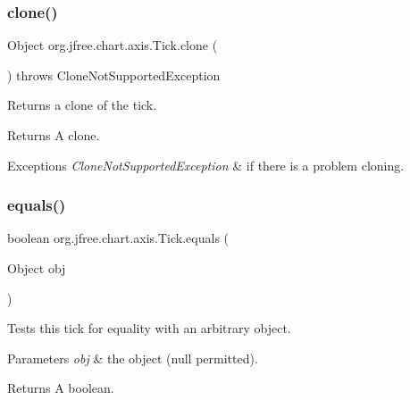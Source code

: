 \subsubsection{\texorpdfstring{clone()}{clone()}}
{\footnotesize\ttfamily Object org.\+jfree.\+chart.\+axis.\+Tick.\+clone (\begin{DoxyParamCaption}{ }\end{DoxyParamCaption}) throws Clone\+Not\+Supported\+Exception}

Returns a clone of the tick.

\begin{DoxyReturn}{Returns}
A clone.
\end{DoxyReturn}

\begin{DoxyExceptions}{Exceptions}
{\em Clone\+Not\+Supported\+Exception} & if there is a problem cloning. \\
\hline
\end{DoxyExceptions}
\mbox{\label{classorg_1_1jfree_1_1chart_1_1axis_1_1_tick_a9cac78e6fd43f85c0ce9f012579ed8b3}} 
\subsubsection{\texorpdfstring{equals()}{equals()}}
{\footnotesize\ttfamily boolean org.\+jfree.\+chart.\+axis.\+Tick.\+equals (\begin{DoxyParamCaption}\item[{Object}]{obj }\end{DoxyParamCaption})}

Tests this tick for equality with an arbitrary object.


\begin{DoxyParams}{Parameters}
{\em obj} & the object ({\ttfamily null} permitted).\\
\hline
\end{DoxyParams}
\begin{DoxyReturn}{Returns}
A boolean. 
\end{DoxyReturn}
\mbox{\label{classorg_1_1jfree_1_1chart_1_1axis_1_1_tick_aeae836adb630dc541a073be7ca934eec}} 
